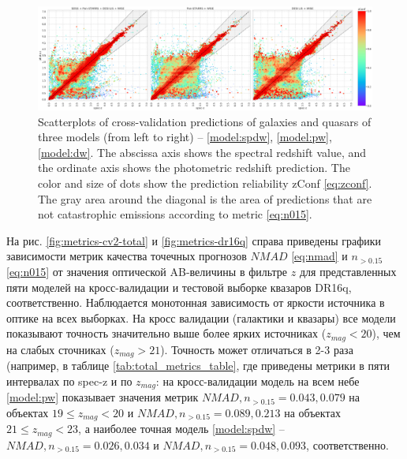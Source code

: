 \documentclass[fleqn,usenatbib]{mnras}
\begin{document}

\begin{figure}
    \centering
    \includegraphics[width=0.99\linewidth]{images/scatterplots-cv2-total-sorted.png}
    \caption{Scatterplots of cross-validation predictions of galaxies and quasars of three models (from left to right) -- \ref{model:spdw}, \ref{model:pw}, \ref{model:dw}. The abscissa axis shows the spectral redshift value, and the ordinate axis shows the photometric redshift prediction. The color and size of dots show the prediction reliability zConf \eqref{eq:zconf}. The gray area around the diagonal is the area of predictions that are not catastrophic emissions according to metric \eqref{eq:n015}.}
    \label{fig:scatter-cv2-total}
\end{figure}

На рис. \ref{fig:metrics-cv2-total} и \ref{fig:metrics-dr16q} справа приведены графики зависимости метрик качества точечных прогнозов $NMAD$ \eqref{eq:nmad} и $n_{>0.15}$ \eqref{eq:n015} от значения оптической AB-величины в фильтре $z$ для представленных пяти моделей на кросс-валидации и тестовой выборке квазаров DR16q, соответственно. Наблюдается монотонная зависимость от яркости источника в оптике на всех выборках. На кросс валидации (галактики и квазары) все модели показывают точность значительно выше более ярких источниках ($z_{mag} < 20$), чем на слабых сточниках ($z_{mag} > 21$). Точность может отличаться в 2-3 раза (например, в таблице \ref{tab:total_metrics_table}, где приведены метрики в пяти интервалах по spec-z и по $z_{mag}$: на кросс-валидации модель на всем небе \ref{model:pw} показывает значения метрик $NMAD, n_{>0.15} = 0.043, 0.079$ на объектах $19 \leq z_{mag} < 20$ и $NMAD, n_{>0.15} = 0.089, 0.213$ на объектах $21 \leq z_{mag} < 23$, а наиболее точная модель \ref{model:spdw} -- $NMAD, n_{>0.15} = 0.026, 0.034$ и $NMAD, n_{>0.15} = 0.048, 0.093$, соответственно.
\end{document}

